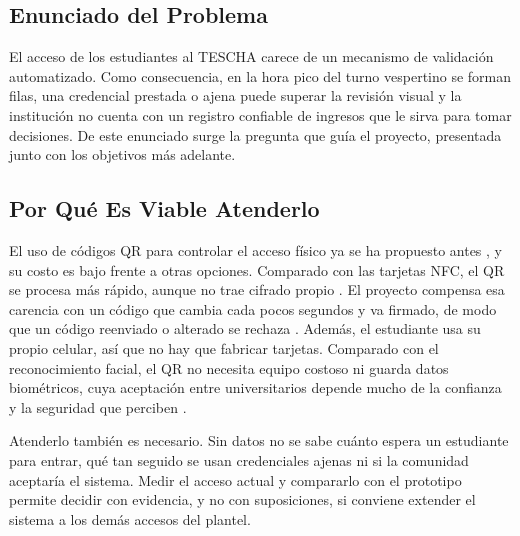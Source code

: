 \subsection{Enunciado del Problema}
El acceso de los estudiantes al TESCHA carece de un mecanismo de validación
automatizado. Como consecuencia, en la hora pico del turno vespertino se
forman filas, una credencial prestada o ajena puede superar la revisión
visual y la institución no cuenta con un registro confiable de ingresos que
le sirva para tomar decisiones. De este enunciado surge la pregunta que guía
el proyecto, presentada junto con los objetivos más adelante.

\subsection{Por Qué Es Viable Atenderlo}
El uso de códigos QR para controlar el acceso físico ya se ha propuesto antes
\parencite{kao2011physical}, y su costo es bajo frente a otras opciones.
Comparado con las tarjetas NFC, el QR se procesa más rápido, aunque no trae
cifrado propio \parencite{harnaningrum2024comparison}. El proyecto compensa
esa carencia con un código que cambia cada pocos segundos y va firmado, de
modo que un código reenviado o alterado se rechaza
\parencite{subpratatsavee2015hmac}. Además, el estudiante usa su propio
celular, así que no hay que fabricar tarjetas. Comparado con el
reconocimiento facial, el QR no necesita equipo costoso ni guarda datos
biométricos, cuya aceptación entre universitarios depende mucho de la
confianza y la seguridad que perciben \parencite{rukhiran2023user}.

Atenderlo también es necesario. Sin datos no se sabe cuánto espera un
estudiante para entrar, qué tan seguido se usan credenciales ajenas ni si la
comunidad aceptaría el sistema. Medir el acceso actual y compararlo con el
prototipo permite decidir con evidencia, y no con suposiciones, si conviene
extender el sistema a los demás accesos del plantel.
